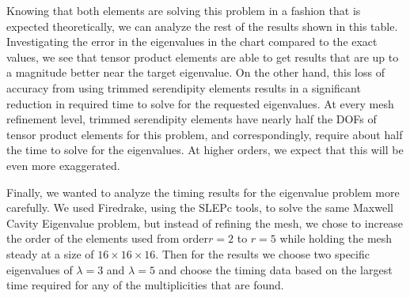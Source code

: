 \documentclass[manuscript,screen]{acmart}
\begin{document}
Knowing that both elements are solving this problem in a fashion that is expected theoretically, we can analyze the rest of the results shown in this table.  Investigating the error in the eigenvalues in the chart compared to the exact values, we see that tensor product elements are able to get results that are up to a magnitude better near the target eigenvalue.  On the other hand, this loss of accuracy from using trimmed serendipity elements results in a significant reduction in required time to solve for the requested eigenvalues.  At every mesh refinement level, trimmed serendipity elements have nearly half the DOFs of tensor product elements for this problem, and correspondingly, require about half the time to solve for the eigenvalues.  At higher orders, we expect that this will be even more exaggerated.  

Finally, we wanted to analyze the timing results for the eigenvalue problem more carefully.  We used Firedrake, using the SLEPc tools, to solve the same Maxwell Cavity Eigenvalue problem, but instead of refining the mesh, we chose to increase the order of the elements used from order$r=2$ to $r=5$ while holding the mesh steady at a size of $16 \times 16 \times 16$.  Then for the results we choose two specific eigenvalues of $\lambda = 3$ and $\lambda = 5$ and choose the timing data based on the largest time required for any of the multiplicities that are found. 
\end{document}
